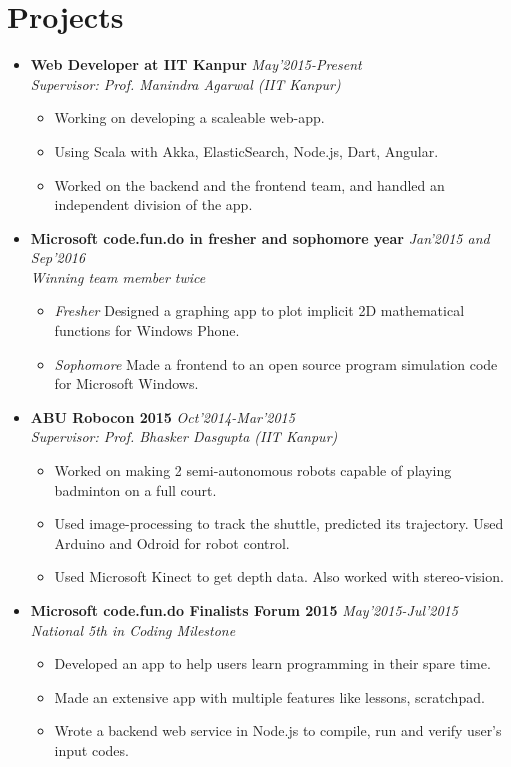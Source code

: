 \documentclass[11pt,a4paper]{article}
\begin{document}
\section*{Projects}
\begin {itemize}

\item \textbf{\large{Web Developer at IIT Kanpur}} \hfill\textit{May'2015-Present}\\ \emph{Supervisor: Prof. Manindra Agarwal (IIT Kanpur)}
  \begin{itemize}
    \setlength \itemsep{0em}
    \item Working on developing a scaleable web-app. 
    \item Using Scala with Akka, ElasticSearch, Node.js, Dart, Angular. 
    \item Worked on the backend and the frontend team, and handled an independent division of the app.
  \end{itemize}

\item \textbf{\large{Microsoft code.fun.do in fresher and sophomore year}} \hfill\textit{ Jan'2015 and Sep'2016}\\ \emph{Winning team member twice}
    \begin{itemize}
    \setlength \itemsep{0em}
    \item \textit{Fresher} Designed a graphing app to plot implicit 2D mathematical functions for Windows Phone.
    \item \textit{Sophomore} Made a frontend to an open source program simulation code for Microsoft Windows.
    \end{itemize}

\item \textbf{\large{ABU Robocon 2015}} \hfill\textit{ Oct'2014-Mar'2015}\\ \emph{Supervisor: Prof. Bhasker Dasgupta (IIT Kanpur)}
    \begin{itemize}
    \setlength \itemsep{0em}
    \item Worked on making 2 semi-autonomous robots capable of playing badminton on a full court.
    \item Used image-processing to track the shuttle, predicted its trajectory. Used Arduino and Odroid for robot control.
    \item Used Microsoft Kinect to get depth data. Also worked with stereo-vision.
    \end{itemize}

\item \textbf{\large{Microsoft code.fun.do Finalists Forum 2015}} \hfill\textit{ May'2015-Jul'2015}\\ \emph{National 5th in Coding Milestone}
    \begin{itemize}
    \setlength \itemsep{0em}
    \item Developed an app to help users learn programming in their spare time.
    \item Made an extensive app with multiple features like lessons, scratchpad.
    \item Wrote a backend web service in Node.js to compile, run and verify user's input codes.
    \end{itemize}


\end{itemize}
\end{document}
